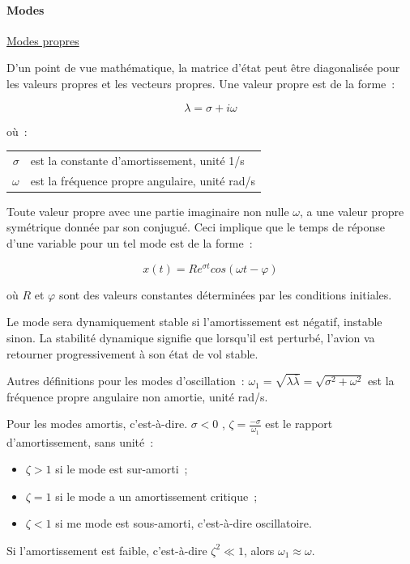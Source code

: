 \documentclass[a4paper,twoside,12pt,dvips]{article}
\begin{document}
\paragraph{Modes}

\underline{Modes propres}

D’un point de vue mathématique, la matrice d’état peut être diagonalisée
pour les valeurs propres et les vecteurs propres. Une valeur propre est de
la forme~:

$$\lambda = \sigma + i \omega $$

où~:

\begin{tabular}{rl}
  $\sigma$ & est la constante d’amortissement, unité 1/s\\
  $\omega$ & est la fréquence propre angulaire, unité rad/s
\end{tabular}

Toute valeur propre avec une partie imaginaire non nulle $\omega$, a une valeur propre symétrique donnée par son conjugué. Ceci implique que le temps de réponse d’une variable pour un tel mode est de la forme~:

$$x(t) = R e^{\sigma t} cos(\omega t - \varphi)$$

où $R$ et $\varphi$ sont des valeurs constantes déterminées par les conditions initiales.

Le mode sera dynamiquement stable si l’amortissement est négatif, instable sinon. La stabilité dynamique signifie que lorsqu’il est perturbé, l’avion va retourner progressivement à son état de vol stable.

Autres définitions pour les modes d’oscillation~: $ \omega_1=\sqrt{\lambda
\bar{\lambda}}=\sqrt{\sigma^2 + \omega^2}$ est la fréquence propre angulaire non amortie, unité rad/s.

Pour les modes amortis, c’est-à-dire. $\textstyle \sigma < 0$ , $\zeta = \frac{-\sigma}{\omega_1}$ est le rapport d’amortissement, sans unité~:

\begin{itemize}
	\item $\zeta > 1$ si le mode est sur-amorti~;
	\item $\zeta = 1$ si le mode a un amortissement critique~;
	\item $\zeta < 1$ si me mode est sous-amorti, c’est-à-dire oscillatoire.
\end{itemize}

Si l’amortissement est faible, c’est-à-dire $ \zeta^2 \ll 1$,
alors $\omega_1 \approx \omega$.
\end{document}
